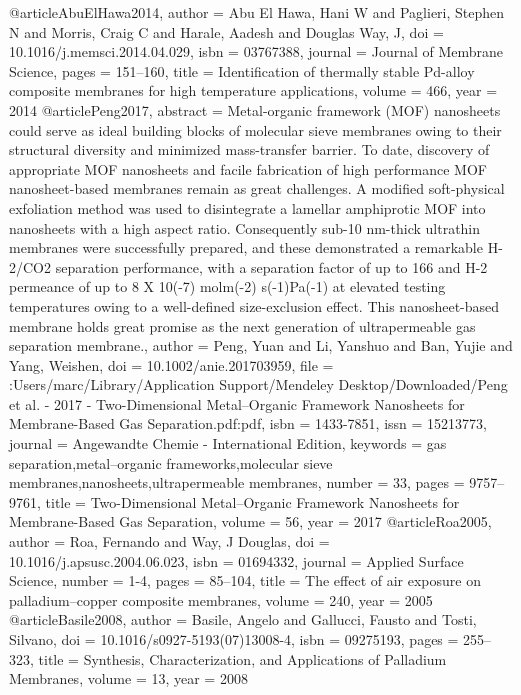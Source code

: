 @article{AbuElHawa2014,
author = {{Abu El Hawa}, Hani W and Paglieri, Stephen N and Morris, Craig C and Harale, Aadesh and {Douglas Way}, J},
doi = {10.1016/j.memsci.2014.04.029},
isbn = {03767388},
journal = {Journal of Membrane Science},
pages = {151--160},
title = {{Identification of thermally stable Pd-alloy composite membranes for high temperature applications}},
volume = {466},
year = {2014}
}
@article{Peng2017,
abstract = {Metal-organic framework (MOF) nanosheets could serve as ideal building blocks of molecular sieve membranes owing to their structural diversity and minimized mass-transfer barrier. To date, discovery of appropriate MOF nanosheets and facile fabrication of high performance MOF nanosheet-based membranes remain as great challenges. A modified soft-physical exfoliation method was used to disintegrate a lamellar amphiprotic MOF into nanosheets with a high aspect ratio. Consequently sub-10 nm-thick ultrathin membranes were successfully prepared, and these demonstrated a remarkable H-2/CO2 separation performance, with a separation factor of up to 166 and H-2 permeance of up to 8 X 10(-7) molm(-2) s(-1)Pa(-1) at elevated testing temperatures owing to a well-defined size-exclusion effect. This nanosheet-based membrane holds great promise as the next generation of ultrapermeable gas separation membrane.},
author = {Peng, Yuan and Li, Yanshuo and Ban, Yujie and Yang, Weishen},
doi = {10.1002/anie.201703959},
file = {:Users/marc/Library/Application Support/Mendeley Desktop/Downloaded/Peng et al. - 2017 - Two-Dimensional Metal–Organic Framework Nanosheets for Membrane-Based Gas Separation.pdf:pdf},
isbn = {1433-7851},
issn = {15213773},
journal = {Angewandte Chemie - International Edition},
keywords = {gas separation,metal–organic frameworks,molecular sieve membranes,nanosheets,ultrapermeable membranes},
number = {33},
pages = {9757--9761},
title = {{Two-Dimensional Metal–Organic Framework Nanosheets for Membrane-Based Gas Separation}},
volume = {56},
year = {2017}
}
@article{Roa2005,
author = {Roa, Fernando and Way, J Douglas},
doi = {10.1016/j.apsusc.2004.06.023},
isbn = {01694332},
journal = {Applied Surface Science},
number = {1-4},
pages = {85--104},
title = {{The effect of air exposure on palladium–copper composite membranes}},
volume = {240},
year = {2005}
}
@article{Basile2008,
author = {Basile, Angelo and Gallucci, Fausto and Tosti, Silvano},
doi = {10.1016/s0927-5193(07)13008-4},
isbn = {09275193},
pages = {255--323},
title = {{Synthesis, Characterization, and Applications of Palladium Membranes}},
volume = {13},
year = {2008}
}
